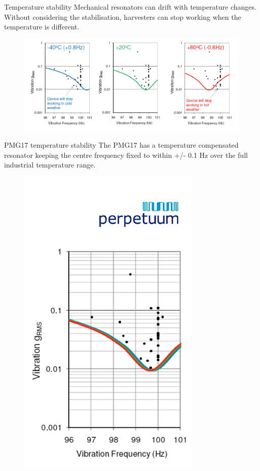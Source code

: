\documentclass[LaTeX2e,10pt]{beamer}
\begin{document}
\begin{frame}{Temperature stability}
Mechanical resonators can drift with temperature changes. Without considering the stabilisation, harvesters can stop working when the temperature is different.
\begin{figure}
	\centering
	\includegraphics[width=1.05\linewidth]{Images/Picture1.png}
\end{figure}
\end{frame}
\begin{frame}{PMG17 temperature stability}
The PMG17 has a temperature compensated resonator keeping the centre frequency fixed to within +/- 0.1 Hz over the full industrial temperature range.
\vskip-20pt
\begin{figure}
	\centering
	\includegraphics[width=0.4\linewidth]{Images/Perpetum.png}
\end{figure}
\end{frame}
\end{document}
